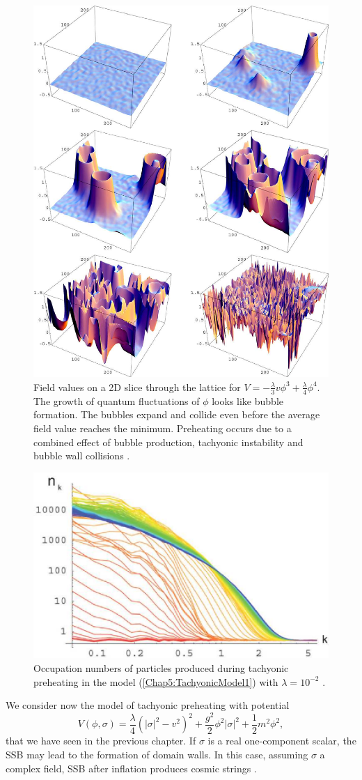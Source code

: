 \documentclass[11pt,a4paper,twoside]{book}
\begin{document}
\begin{figure}
	\centering
	\includegraphics[width=0.7\linewidth, height=0.5\textheight]{Images/Chap5/TachyonicInstability_Fig12}
	\caption{Field values on a 2D slice through the lattice for $ V=-\frac{\lambda}{3}v\phi^{3} + \frac{\lambda}{4}\phi^{4} $. The growth of quantum fluctuations of $\phi$ looks like bubble formation. The bubbles expand and collide even before the average field value reaches the minimum. Preheating occurs due to a combined effect of bubble production, tachyonic instability and bubble wall collisions \cite{Chap5:TachyonicInstability}.}
	\label{fig:tachyonicinstabilityfig12}
\end{figure}
\begin{figure}
	\centering
	\includegraphics[width=0.6\linewidth, height=0.25\textheight]{Images/Chap5/TachyonicInstability_Fig14}
	\caption{Occupation numbers of particles produced during tachyonic preheating in the model (\ref{Chap5:TachyonicModel1}) with $\lambda = 10^{-2}$ \cite{Chap5:TachyonicInstability}.}
	\label{fig:tachyonicinstabilityfig14}
\end{figure}
We consider now the model of tachyonic preheating with potential
\begin{equation}
\label{Chap5:TachyonicPreheatingPotential}
V(\phi,\sigma)=\frac{\lambda}{4}(|\sigma|^{2}-v^{2})^{2} + \frac{g^{2}}{2}\phi^{2}|\sigma|^{2} + \frac{1}{2}m^{2}\phi^{2},
\end{equation}
that we have seen in the previous chapter. If $\sigma$ is a real one-component scalar, the SSB may lead to the formation of domain walls. In this case, assuming $\sigma$ a complex field, SSB after inflation produces cosmic strings \cite{Chap5:DynamicsSymmetryBreaking}. 
\end{document}
